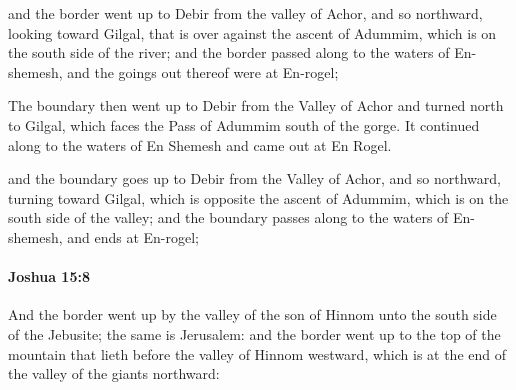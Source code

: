 			\begin{versebox}
					\item[BHS] 
					\item[ASV] and the border went up to Debir from the valley of Achor, and so northward, looking toward Gilgal, that is over against the ascent of Adummim, which is on the south side of the river; and the border passed along to the waters of En-shemesh, and the goings out thereof were at En-rogel;
					\item[NIV] The boundary then went up to Debir from the Valley of Achor and turned north to Gilgal, which faces the Pass of Adummim south of the gorge. It continued along to the waters of En Shemesh and came out at En Rogel.
					\item[NRSV] and the boundary goes up to Debir from the Valley of Achor, and so northward, turning toward Gilgal, which is opposite the ascent of Adummim, which is on the south side of the valley; and the boundary passes along to the waters of En-shemesh, and ends at En-rogel;
			\end{versebox}

		\paragraph{Joshua 15:8} %
			\label{JOSHUA-15-8}

			And the border went up by the valley of the son of Hinnom unto the south side of the Jebusite; the same is Jerusalem: and the border went up to the top of the mountain that lieth before the valley of Hinnom westward, which is at the end of the valley of the giants northward:

